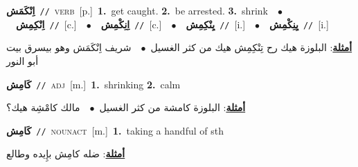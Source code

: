 \documentclass[10pt,a4paper,twoside]{article} %
\begin{document}
\begin{multicols}{2}
{\setlength\topsep{0pt}\textbf{\foreignlanguage{arabic}{اِنْكَمَش}}\ {\color{gray}\texttt{//}\color{black}}\ \textsc{verb}\ [p.]\ \textbf{1.}~get caught.  \textbf{2.}~be arrested.  \textbf{3.}~shrink\ \ $\bullet$\ \ \setlength\topsep{0pt}\textbf{\foreignlanguage{arabic}{اِنْكِمِش}}\ {\color{gray}\texttt{//}\color{black}}\ [c.]\ \ $\bullet$\ \ \setlength\topsep{0pt}\textbf{\foreignlanguage{arabic}{اِنِكْمِش}}\ {\color{gray}\texttt{//}\color{black}}\ [c.]\ \ $\bullet$\ \ \setlength\topsep{0pt}\textbf{\foreignlanguage{arabic}{يِنْكِمِش}}\ {\color{gray}\texttt{//}\color{black}}\ [i.]\ \ $\bullet$\ \ \setlength\topsep{0pt}\textbf{\foreignlanguage{arabic}{يِنِكْمِش}}\ {\color{gray}\texttt{//}\color{black}}\ [i.]\  \begin{flushright}\color{gray}\foreignlanguage{arabic}{\textbf{\underline{\foreignlanguage{arabic}{أمثلة}}}: البلوزة هيك رح تِنْكِمِش هيك من كثر الغسيل\ $\bullet$\ \  شريف اِنْكَمَش وهو بيسرق بيت أبو النور}\end{flushright}\color{black}} \vspace{2mm}

{\setlength\topsep{0pt}\textbf{\foreignlanguage{arabic}{كَامِش}}\ {\color{gray}\texttt{//}\color{black}}\ \textsc{adj}\ [m.]\ \textbf{1.}~shrinking  \textbf{2.}~calm\  \begin{flushright}\color{gray}\foreignlanguage{arabic}{\textbf{\underline{\foreignlanguage{arabic}{أمثلة}}}: البلوزة كامشة من كثر الغسيل\ $\bullet$\ \  مالك كامْشِة هيك؟}\end{flushright}\color{black}} \vspace{2mm}

{\setlength\topsep{0pt}\textbf{\foreignlanguage{arabic}{كَامِش}}\ {\color{gray}\texttt{//}\color{black}}\ \textsc{noun\textunderscore act}\ [m.]\ \textbf{1.}~taking a handful of sth\  \begin{flushright}\color{gray}\foreignlanguage{arabic}{\textbf{\underline{\foreignlanguage{arabic}{أمثلة}}}: ضله كامِش بإِيده وطالع}\end{flushright}\color{black}} \vspace{2mm}


\end{multicols}
\end{document}
